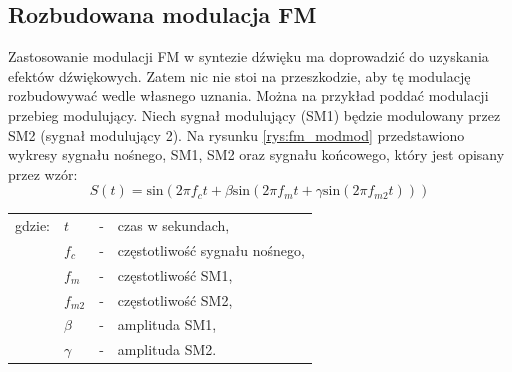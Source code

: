\subsection{Rozbudowana modulacja FM}
Zastosowanie modulacji FM w syntezie dźwięku ma doprowadzić do uzyskania efektów dźwiękowych. Zatem nic nie stoi na przeszkodzie, aby tę modulację rozbudowywać wedle własnego uznania. Można na przykład poddać modulacji przebieg modulujący. Niech sygnał modulujący (SM1) będzie modulowany przez SM2 (sygnał modulujący 2). Na rysunku \ref{rys:fm_modmod} przedstawiono wykresy sygnału nośnego, SM1, SM2 oraz sygnału końcowego, który jest opisany przez wzór:
\begin{equation} \label{equ:fm_modmod}
S(t)= \text{sin}(2 \pi f_c t + \beta \text{sin}(2 \pi f_m t + \gamma \text{sin}(2 \pi f_{m2} t)))
\end{equation}
\begin{tabular}{ l l l l}
	gdzie: & $t$ &  - & czas w sekundach, \\
	&	$f_c$ & - &  częstotliwość sygnału nośnego,\\
	&	$f_m$ & - &  częstotliwość SM1,\\
	&	$f_{m2}$ & - &  częstotliwość SM2,\\
	&	$\beta$ & - & amplituda SM1,\\
	&	$\gamma$ & - & amplituda SM2.\\
\end{tabular} \\ \\

